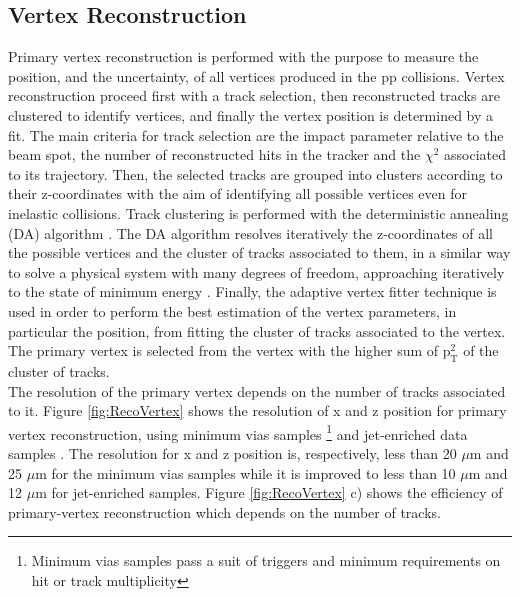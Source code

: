 \subsection{Vertex Reconstruction}


Primary vertex reconstruction is performed with the purpose to measure the position, and the uncertainty, 
of all vertices produced in the pp collisions. Vertex reconstruction proceed first with a 
track selection, then reconstructed tracks are clustered to identify vertices, and finally the vertex position
is determined by a fit. The main criteria for track selection are the impact parameter relative to the beam spot, the
number of reconstructed hits in the tracker and the $\chi^{2}$ associated to its trajectory. Then, the 
selected tracks are grouped into clusters according to their z-coordinates with the aim of identifying
all possible vertices even for inelastic collisions. Track clustering is performed with the 
deterministic annealing (DA) algorithm \cite{VertexRecoBIB}. The DA algorithm resolves iteratively
the z-coordinates of all the possible vertices and the cluster of tracks associated to them, in a similar way 
to solve a physical system with many degrees of freedom, approaching iteratively to the state 
of minimum energy \cite{Chatrchyan:2014fea}. Finally, the adaptive vertex fitter technique \cite{Fruhwirth:1027031}
is used in order to perform the best estimation of the vertex parameters, in particular the position,
from fitting the cluster of tracks associated to the vertex. The primary vertex is selected from the vertex with the higher
sum of $\textrm{p}_{\textrm{T}}^{2}$ of the cluster of tracks.\\

The resolution of the primary vertex depends on the number of tracks associated to it. Figure \ref{fig:RecoVertex} 
shows the resolution of x and z position for primary vertex reconstruction, using minimum vias samples 
\footnote{Minimum vias samples pass a suit of triggers and minimum requirements on hit 
or track multiplicity} and jet-enriched data samples \cite{Chatrchyan:2014fea}. The resolution for x and z position 
is, respectively, less than 20 $\mu$m and 25 $\mu$m for the minimum vias samples while it is 
improved to less than 10 $\mu$m and 12 $\mu$m for jet-enriched samples. Figure \ref{fig:RecoVertex} c) shows
the efficiency of primary-vertex reconstruction which depends on the number of tracks. 

